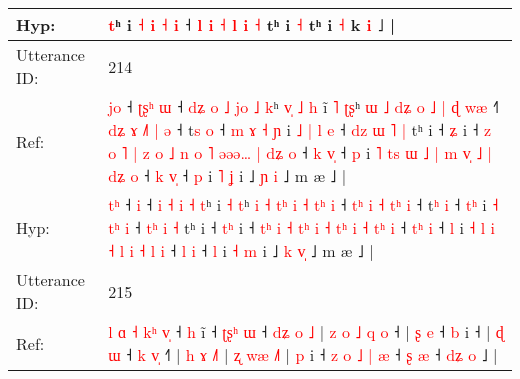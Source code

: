 \documentclass[10pt]{article}
\DeclareRobustCommand{\hl}[1]{{\textcolor{red}{#1}}}
\begin{document}
\begin{longtable}{ll}
 \\
Hyp: & \hl{}\hl{}\hl{}\hl{}\hl{}\hl{t}ʰ\hl{}\hl{}\hl{}\hl{}\hl{}\hl{}\hl{} i\hl{} \hl{˧} \hl{i} \hl{}\hl{}\hl{˧} \hl{i} ˧ \hl{}\hl{l} \hl{i} \hl{˧} \hl{l} \hl{i} \hl{˧} tʰ i\hl{}\hl{}\hl{}\hl{}\hl{}\hl{}\hl{}\hl{}\hl{}\hl{} \hl{˧} tʰ i \hl{˧} k\hl{} \hl{i} ˩\hl{} |
 \\
\midrule
Utterance ID: & 214 \\
Ref: & \hl{j}\hl{o} ˧\hl{ }\hl{ʈ}\hl{ʂ}\hl{ʰ} \hl{ɯ} ˧\hl{ }\hl{d}\hl{ʑ} \hl{o} \hl{˩} \hl{j}\hl{o} \hl{˩} \hl{k}ʰ\hl{ }\hl{v}\hl{̩}\hl{ }\hl{˩}\hl{ }\hl{h} i\hl{̃} \hl{˥} \hl{ʈ}\hl{ʂ}ʰ \hl{ɯ} \hl{˩} \hl{d}\hl{ʑ} \hl{o} \hl{˩} \hl{|}\hl{ }\hl{ɖ} \hl{w}\hl{æ} ˧\hl{˥} \hl{d}\hl{ʑ} \hl{ɤ} \hl{˩}\hl{˥}\hl{ }\hl{|} \hl{ə} ˧ t\hl{s} \hl{o} ˧\hl{ }\hl{m}\hl{ }\hl{ɤ} \hl{˧}\hl{ }\hl{ɲ} i \hl{˩} \hl{|}\hl{ }\hl{l} \hl{e} ˧ \hl{d}\hl{z}\hl{ }\hl{ɯ} \hl{˥} \hl{|} tʰ i ˧ \hl{}\hl{ʑ} i ˧ \hl{z}\hl{ }\hl{o} \hl{˥} \hl{|} \hl{z}\hl{ }\hl{o} \hl{˩} \hl{n} \hl{o}\hl{ }\hl{˥} \hl{ə}\hl{ə}\hl{ə}\hl{…} \hl{|} \hl{d}\hl{ʑ} \hl{o} ˧ \hl{k}\hl{ }\hl{v}\hl{̩} ˧ \hl{p} i\hl{ }\hl{˥}\hl{ }\hl{t}\hl{s} \hl{ɯ} \hl{˩} \hl{|} \hl{m} \hl{v}\hl{̩} \hl{˩} \hl{|} \hl{d}\hl{ʑ} \hl{o} ˧ \hl{k} \hl{v}\hl{̩} ˧ \hl{p} i \hl{˥} \hl{ʝ} i ˩ \hl{ɲ} \hl{}\hl{i} ˩ m æ ˩ |
 \\
Hyp: & \hl{t}\hl{ʰ} ˧\hl{}\hl{}\hl{}\hl{} \hl{i} ˧\hl{}\hl{}\hl{} \hl{i} \hl{˧} \hl{}\hl{i} \hl{˧} \hl{t}ʰ\hl{}\hl{}\hl{}\hl{}\hl{}\hl{}\hl{} i\hl{} \hl{˧} \hl{}\hl{t}ʰ \hl{i} \hl{˧} \hl{t}\hl{ʰ} \hl{i} \hl{˧} \hl{}\hl{t}\hl{ʰ} \hl{}\hl{i} ˧\hl{} \hl{t}\hl{ʰ} \hl{i} \hl{˧}\hl{ }\hl{t}\hl{ʰ} \hl{i} ˧ t\hl{ʰ} \hl{i} ˧\hl{}\hl{}\hl{}\hl{} \hl{}\hl{t}\hl{ʰ} i \hl{˧} \hl{}\hl{t}\hl{ʰ} \hl{i} ˧ \hl{}\hl{}\hl{t}\hl{ʰ} \hl{i} \hl{˧} tʰ i ˧ \hl{t}\hl{ʰ} i ˧ \hl{}\hl{t}\hl{ʰ} \hl{i} \hl{˧} \hl{}\hl{t}\hl{ʰ} \hl{i} \hl{˧} \hl{}\hl{t}\hl{ʰ} \hl{}\hl{}\hl{}\hl{i} \hl{˧} \hl{t}\hl{ʰ} \hl{i} ˧ \hl{t}\hl{ʰ}\hl{ }\hl{i} ˧ \hl{l} i\hl{}\hl{}\hl{}\hl{}\hl{} \hl{˧} \hl{l} \hl{i} \hl{˧} \hl{}\hl{l} \hl{i} \hl{˧} \hl{}\hl{l} \hl{i} ˧ \hl{l} \hl{}\hl{i} ˧ \hl{l} i \hl{˧} \hl{m} i ˩ \hl{k} \hl{v}\hl{̩} ˩ m æ ˩ |
 \\
\midrule
Utterance ID: & 215 \\
Ref: & \hl{l} \hl{ɑ} \hl{˧} \hl{k}\hl{ʰ} \hl{v}\hl{̩} ˧ \hl{h} i\hl{̃} ˧ \hl{ʈ}\hl{ʂ}\hl{ʰ} \hl{ɯ} ˧ \hl{d}\hl{ʑ} \hl{o} \hl{˩} |\hl{ }\hl{z} \hl{o} \hl{˩} \hl{q} \hl{o} ˧ |\hl{ }\hl{ʂ} \hl{e} ˧ \hl{b} i ˧ |\hl{ }\hl{ɖ} \hl{ɯ} ˧ \hl{k} \hl{v}\hl{̩} ˧\hl{˥} |\hl{ }\hl{h} \hl{ɤ} \hl{˩}\hl{˥} |\hl{ }\hl{ʐ} \hl{w}\hl{æ} \hl{˩}\hl{˥} |\hl{ }\hl{p} i ˧ \hl{z} \hl{o} \hl{˩} \hl{|} \hl{æ} ˧ \hl{}\hl{ʂ} \hl{æ} ˧ \hl{d}\hl{ʑ} \hl{o} ˩ |

\end{longtable}
\end{document}
